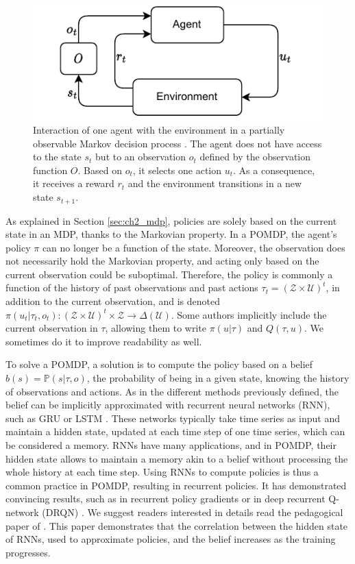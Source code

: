 \begin{figure}
    \centering
    \includegraphics[width=.8\linewidth]{tex_thesis/figures/ch2/POMDP.pdf}
    \caption{Interaction of one agent with the environment in a partially observable Markov decision process \citep{KAELBLING199899}. The agent does not have access to the state $s_t$ but to an observation $o_t$ defined by the observation function $O$. Based on $o_t$, it selects one action $u_t$. As a consequence, it receives a reward $r_t$ and the environment transitions in a new state $s_{t+1}$.}
    \label{fig:ch2_pomdp}
\end{figure}

As explained in Section \ref{sec:ch2_mdp}, policies are solely based on the current state in an MDP, thanks to the Markovian property.
In a POMDP, the agent's policy $\pi$ can no longer be a function of the state.
Moreover, the observation does not necessarily hold the Markovian property, and acting only based on the current observation could be suboptimal.
Therefore, the policy is commonly a function of the history of past observations and past actions $\tau_t=(\mathcal{Z} \times \mathcal{U})^t$, in addition to the current observation, and is denoted $\pi(u_t|\tau_t,o_t): (\mathcal{Z} \times \mathcal{U})^t \times \mathcal{Z} \rightarrow \Delta(\mathcal{U})$.
Some authors implicitly include the current observation in $\tau$, allowing them to write $\pi(u|\tau)$ and $Q(\tau,u)$.
We sometimes do it to improve readability as well.

To solve a POMDP, a solution is to compute the policy based on a belief $b(s)=\mathbb{P}(s|\tau,o)$, the probability of being in a given state, knowing the history of observations and actions.
As in the different methods previously defined, the belief can be implicitly approximated with recurrent neural networks (RNN), such as GRU \citep{Chung2014EmpiricalModeling} or LSTM \citep{Hochreiter1997LongMemory}.
These networks typically take time series as input and maintain a hidden state, updated at each time step of one time series, which can be considered a memory.
RNNs have many applications, and in POMDP, their hidden state allows to maintain a memory akin to a belief without processing the whole history at each time step.
Using RNNs to compute policies is thus a common practice in POMDP, resulting in recurrent policies.
It has demonstrated convincing results, such as in recurrent policy gradients \citep{wierstra2010recurrent} or in deep recurrent Q-network (DRQN) \citep{Hausknecht2015DeepMDPs}.
We suggest readers interested in details read the pedagogical paper of \cite{lambrechts2022recurrent}.
This paper demonstrates that the correlation between the hidden state of RNNs, used to approximate policies, and the belief increases as the training progresses.

